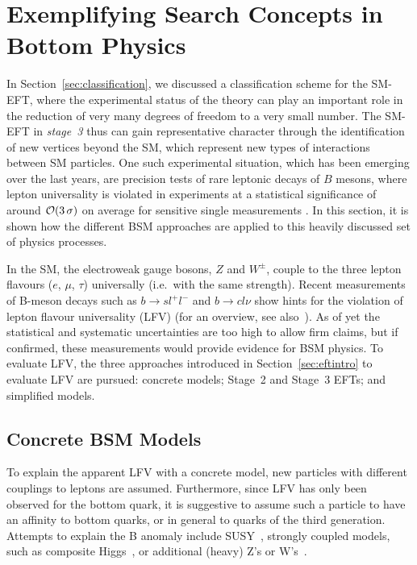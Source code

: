 { %
\section{Exemplifying Search Concepts in Bottom Physics}\label{sec:BphysicsConcepts}

In Section~\ref{sec:classification}, we discussed a classification
scheme for the SM-EFT, where the experimental status of the theory can
play an important role in the reduction of very many degrees of
freedom to a very small number. The SM-EFT in \emph{stage~3} thus can
gain representative character through the identification of new
vertices beyond the SM, which represent new types of interactions
between SM particles. One such experimental situation, which has been
emerging over the last years, are precision tests of rare leptonic
decays of $B$ mesons, where lepton universality is
violated in experiments
at a statistical significance of around ${\cal O}(3\,\sigma)$ on
average for sensitive single measurements \citep{Aaij:2015oid,Aaij:2017vbb,Aaij:2019wad,Abdesselam:2019dgh,Abdesselam:2019wac,Buttazzo:2017ixm}.
In this section, it is shown how the different BSM approaches are applied to this heavily discussed set of physics processes.

In the SM, the electroweak gauge bosons, $Z$ and $W^\pm$, couple to
the three lepton flavours ($e$, $\mu$, $\tau$) universally (i.e.\ with
the same strength).  Recent measurements of B-meson decays such as
$b \to sl^+l^-$ and $b \to c l \nu$ show hints for the violation of
lepton flavour universality (LFV) (for an overview, see
also~\citep{Albrecht:2018frt}).  As of yet the statistical and systematic
uncertainties are too high to allow firm claims, but if confirmed,
these measurements would provide evidence for BSM physics. To evaluate
LFV, the three approaches introduced in
Section~\ref{sec:eftintro} to evaluate LFV are pursued: concrete
models; Stage~2 and Stage~3 EFTs; and
simplified models. 

\subsection{Concrete BSM Models}
\label{sec:B-con-BSM}

To explain the apparent LFV with a concrete model, new particles with
different couplings to leptons are assumed.  Furthermore, since LFV
has only been observed for the bottom quark, it is suggestive to
assume such a particle to have an affinity to bottom quarks, or in
general to quarks of the third generation.  Attempts to explain the B
anomaly include SUSY~\citep{Altmannshofer:2017poe}, strongly
coupled models, such as composite Higgs~\citep{Greljo:2015mma}, or
additional (heavy) Z's or W's~\citep{Boucenna:2016qad}.

}
